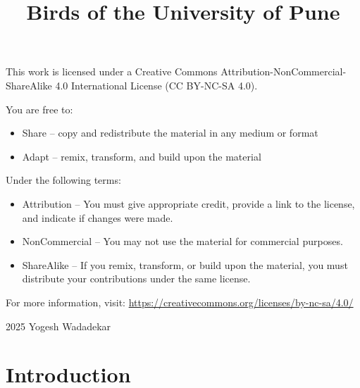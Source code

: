 \documentclass[a4paper,12pt,landscape]{memoir}
\title{Birds of the University of Pune}
\author{}
\date{}
\begin{document}
\maketitle

\begin{center}
\vspace{1cm}
{\large This work is licensed under a Creative Commons Attribution-NonCommercial-ShareAlike 4.0 International License (CC BY-NC-SA 4.0).}

\vspace{0.5cm}
{\normalsize You are free to:
\begin{itemize}
\item Share -- copy and redistribute the material in any medium or format
\item Adapt -- remix, transform, and build upon the material
\end{itemize}

Under the following terms:
\begin{itemize}
\item Attribution -- You must give appropriate credit, provide a link to the license, and indicate if changes were made.
\item NonCommercial -- You may not use the material for commercial purposes.
\item ShareAlike -- If you remix, transform, or build upon the material, you must distribute your contributions under the same license.
\end{itemize}
}

\vspace{0.5cm}
{\small For more information, visit: \url{https://creativecommons.org/licenses/by-nc-sa/4.0/}}

\vspace{1cm}
{\large\textcopyright{} 2025 Yogesh Wadadekar}
\end{center}

\chapter*{Introduction}
\end{document}
